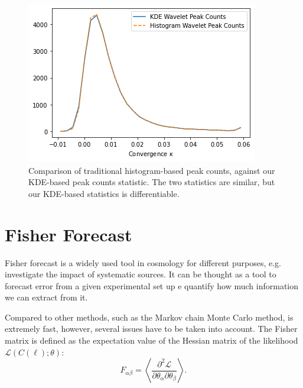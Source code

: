 \documentclass[twocolumn,twocolappendix]{aastex63}
\begin{document}
 


\begin{figure}
    \centering
    \includegraphics[width=\columnwidth]{figures/peakcounts.png}
    \caption{Comparison of traditional histogram-based peak counts, against our  KDE-based peak counts statistic. The two statistics are similar, but our KDE-based statistics is differentiable.}
    \label{fig:comp_statistics}
\end{figure}

\section{Fisher Forecast}
Fisher forecast is a widely used tool in cosmology for different purposes, e.g. investigate the impact of systematic sources. It can be thought as a tool to forecast error from a given experimental set up e quantify how much information we can extract from it. 

Compared to other methods, such as the Markov chain Monte Carlo method, is extremely fast, however, several issues have to be taken into account. 
The Fisher matrix is defined as the expectation value of the Hessian matrix of the likelihood $\mathcal{L}(C(\ell);\theta)$:
\begin{equation}
    F_{\alpha \beta}=\left \langle 
    \frac{\partial^2\mathcal{L}}
    {\partial \theta_{\alpha}\partial \theta_{\beta}}
    \right \rangle .
\end{equation}
\end{document}
